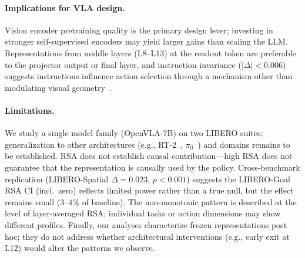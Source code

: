 \paragraph{Implications for VLA design.}
Vision encoder pretraining quality is the primary design lever; investing in stronger self-supervised encoders may yield larger gains than scaling the LLM.
Representations from middle layers (L8--L13) at the readout token are preferable to the projector output or final layer, and instruction invariance ($|\Delta| < 0.006$) suggests instructions influence action selection through a mechanism other than modulating visual geometry~\cite{grant2026}.

\paragraph{Limitations.}
We study a single model family (OpenVLA-7B) on two LIBERO suites; generalization to other architectures (e.g., RT-2~\cite{brohan2023_rt2}, $\pi_0$~\cite{black2024_pi0}) and domains remains to be established.
RSA does not establish causal contribution---high RSA does not guarantee that the representation is causally used by the policy.
Cross-benchmark replication (LIBERO-Spatial $\Delta = 0.023$, $p < 0.001$) suggests the LIBERO-Goal RSA CI (incl.\ zero) reflects limited power rather than a true null, but the effect remains small ($3$--$4\%$ of baseline).
The non-monotonic pattern is described at the level of layer-averaged RSA; individual tasks or action dimensions may show different profiles.
Finally, our analyses characterize frozen representations post hoc; they do not address whether architectural interventions (e.g., early exit at L12) would alter the patterns we observe.
